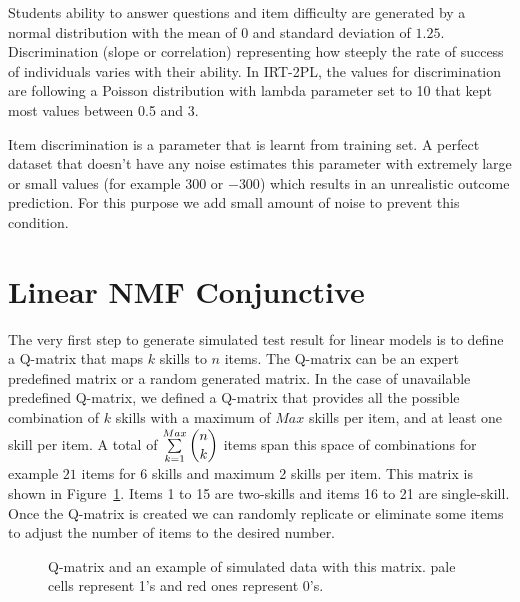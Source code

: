 
Students ability to answer questions and item difficulty are generated by a normal distribution with the mean of $0$ and standard deviation of $1.25$. Discrimination (slope or correlation) representing how steeply the rate of success of individuals varies with their ability. In IRT-2PL, the values for discrimination are following a Poisson distribution with lambda parameter set to 10 that kept most values between 0.5 and 3. 

Item discrimination is a parameter that is learnt from training set. A perfect dataset that doesn't have any noise estimates this parameter with extremely large or small values (for example $300$ or $-300$)  which results in an unrealistic outcome prediction. For this purpose we add small amount of noise to prevent this condition.

\section{Linear NMF Conjunctive}

The very first step to generate simulated test result for linear models is to define a Q-matrix that maps $k$ skills to $n$ items. The Q-matrix can be an expert predefined matrix or a random generated matrix. In the case of unavailable predefined Q-matrix, we defined a Q-matrix that provides all the possible combination of $k$ skills with a maximum of $Max$ skills per item, and at least one skill per item. A total of $\sum\limits_{k=1}^{Max} \dbinom{n}{k}$ items span this space of combinations for example $21$ items for 6 skills and maximum 2 skills per item. This matrix is shown in Figure~\ref{figqmatrixandResutM}. Items 1 to 15 are two-skills and items 16 to 21 are single-skill. Once the Q-matrix is created we can randomly replicate or eliminate some items to adjust the number of items to the desired number. 

\begin{figure}[ht]
\centering

\quad
\caption{Q-matrix and an example of simulated data with this matrix.  pale cells represent 1's and red ones represent 0's.}
\label{figqmatrixandResutM}
\end{figure}

